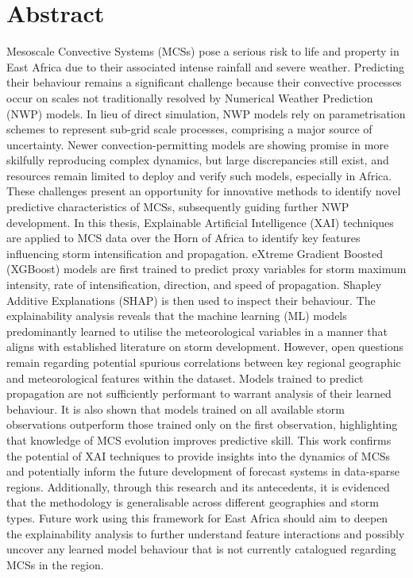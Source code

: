 \chapter*{\center \Large  Abstract}

\noindent
Mesoscale Convective Systems (MCSs) pose a serious risk to life and property in East Africa due to their associated intense rainfall and severe weather. Predicting their behaviour remains a significant challenge because their convective processes occur on scales not traditionally resolved by Numerical Weather Prediction (NWP) models. In lieu of direct simulation, NWP models rely on parametrisation schemes to represent sub-grid scale processes, comprising a major source of uncertainty. Newer convection-permitting models are showing promise in more skilfully reproducing complex dynamics, but large discrepancies still exist, and resources remain limited to deploy and verify such models, especially in Africa. These challenges present an opportunity for innovative methods to identify novel predictive characteristics of MCSs, subsequently guiding further NWP development. In this thesis, Explainable Artificial Intelligence (XAI) techniques are applied to MCS data over the Horn of Africa to identify key features influencing storm intensification and propagation. eXtreme Gradient Boosted (XGBoost) models are first trained to predict proxy variables for storm maximum intensity, rate of intensification, direction, and speed of propagation. Shapley Additive Explanations (SHAP) is then used to inspect their behaviour. The explainability analysis reveals that the machine learning (ML) models predominantly learned to utilise the meteorological variables in a manner that aligns with established literature on storm development. However, open questions remain regarding potential spurious correlations between key regional geographic and meteorological features within the dataset. Models trained to predict propagation are not sufficiently performant to warrant analysis of their learned behaviour. It is also shown that models trained on all available storm observations outperform those trained only on the first observation, highlighting that knowledge of MCS evolution improves predictive skill. This work confirms the potential of XAI techniques to provide insights into the dynamics of MCSs and potentially inform the future development of forecast systems in data-sparse regions. Additionally, through this research and its antecedents, it is evidenced that the methodology is generalisable across different geographies and storm types. Future work using this framework for East Africa should aim to deepen the explainability analysis to further understand feature interactions and possibly uncover any learned model behaviour that is not currently catalogued regarding MCSs in the region.

